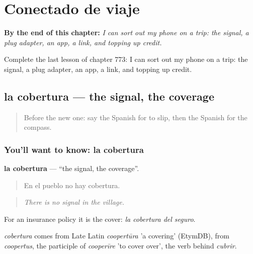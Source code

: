 
\chapter{Conectado de viaje}
\label{ch:es-conectado-de-viaje}

\begin{chapteropening}
\textbf{By the end of this chapter:} \emph{I can sort out my phone on a trip: the signal, a plug adapter, an app, a link, and topping up credit.}

Complete the last lesson of chapter 773: I can sort out my phone on a trip: the signal, a plug adapter, an app, a link, and topping up credit.
\end{chapteropening}

\section[la cobertura]{la cobertura — the signal, the coverage}

\label{lesson:ES-C773-cobertura}



\begin{quote}
Before the new one: say the Spanish for to slip, then the Spanish for the compass.
\end{quote}

\subsection*{You'll want to know: la cobertura}
\textbf{la cobertura} — \textquotedblleft{}the signal, the coverage\textquotedblright{}.

\begin{quote}
En el pueblo no hay cobertura.
\end{quote}

\begin{quote}
\emph{There is no signal in the village.}
\end{quote}

For an insurance policy it is the cover: \emph{la cobertura del seguro}.

\begin{cousinweb}
\emph{cobertura} comes from Late Latin \emph{coopertūra} 'a covering' (EtymDB), from \emph{coopertus}, the participle of \emph{cooperīre} 'to cover over', the verb behind \emph{cubrir}.
\end{cousinweb}

